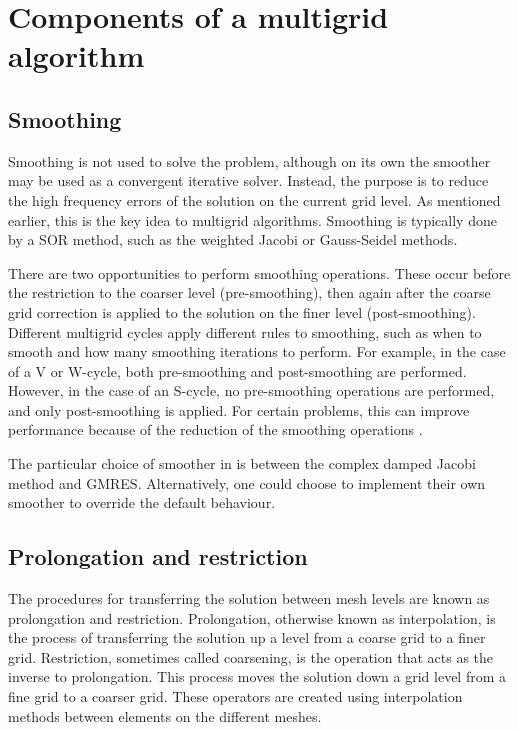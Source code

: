 







\section{Components of a multigrid algorithm}

\subsection{Smoothing}

Smoothing is not used to solve the problem, although on its own the smoother may be used as a convergent iterative solver.
Instead, the purpose is to reduce the high frequency errors of the solution on the current grid level.
As mentioned earlier, this is the key idea to multigrid algorithms.
Smoothing is typically done by a SOR method, such as the weighted Jacobi or Gauss-Seidel methods.

There are two opportunities to perform smoothing operations.
These occur before the restriction to the coarser level (pre-smoothing), then again after the coarse grid correction is applied to the solution on the finer level (post-smoothing).
Different multigrid cycles apply different rules to smoothing, such as when to smooth and how many smoothing iterations to perform.
For example, in the case of a V or W-cycle, both pre-smoothing and post-smoothing are performed.
However, in the case of an S-cycle, no pre-smoothing operations are performed, and only post-smoothing is applied.
For certain problems, this can improve performance because of the reduction of the smoothing operations \cite{iyengar}.

The particular choice of smoother in \oomph is between the complex damped Jacobi method and GMRES.
Alternatively, one could choose to implement their own smoother to override the default behaviour.




\subsection{Prolongation and restriction}

The procedures for transferring the solution between mesh levels are known as prolongation and restriction.
Prolongation, otherwise known as interpolation, is the process of transferring the solution up a level from a coarse grid to a finer grid.
Restriction, sometimes called coarsening, is the operation that acts as the inverse to prolongation.
This process moves the solution down a grid level from a fine grid to a coarser grid.
These operators are created using interpolation methods between elements on the different meshes.

